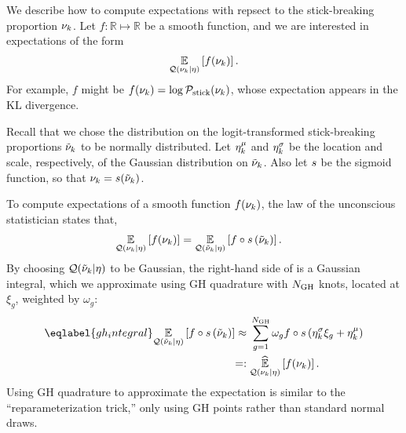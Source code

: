 We describe how to compute expectations with repsect to the stick-breaking
proportion $\nu_k$. Let $f: \mathbb{R}\mapsto\mathbb{R}$ be a smooth function,
and we are interested in expectations of the form
\begin{align*}
  \underset{\mathcal{Q}(\nu_{k} \vert \eta)}{\mathbb{E}}\left[f(\nu_{k})\right].
\end{align*}
For example, $f$ might be $f(\nu_k) = \log \mathcal{P}_{\mathrm{stick}}(\nu_k)$, whose
expectation appears in the $\mathrm{KL}$ divergence.

Recall that we chose the distribution on the logit-transformed
stick-breaking proportions $\tilde{\nu}_k$ to be normally distributed.
Let $\eta^{\mu}_k$ and $\eta^{\sigma}_k$ be the location and scale, respectively,
of the Gaussian distribution on $\tilde{\nu}_k$.
Also let $s$ be the sigmoid function, so that $\nu_k = s(\tilde{\nu}_k)$.

To compute expectations of a smooth function
$f(\nu_{k})$, the law of the unconscious statistician states that,
\begin{align*}
  \underset{\mathcal{Q}(\nu_{k} \vert \eta)}{\mathbb{E}}\left[f(\nu_{k})\right] ={}&
  \underset{\mathcal{Q}(\tilde{\nu}_k \vert \eta)}{\mathbb{E}}\left[f\circ s\left(\tilde{\nu}_k\right)\right].
\end{align*}
By choosing $\mathcal{Q}(\tilde{\nu}_k \vert \eta)$ to be Gaussian,
the right-hand side of is a Gaussian integral,
which we approximate
using GH quadrature with $N_{\mathrm{GH}}$ knots,
located at $\xi_g$, weighted by $\omega_g$:
%
\begin{align}\eqlabel{gh_integral}
%
\expect{\q(\lnu_\k \vert \eta)}
       {f\circ \s\left(\lnu_\k\right)}
\approx{}&
    \sum_{g=1}^{\ngh} \omega_g f\circ \s \left(\lnusd_\k \xi_{g} + \lnumean_\k\right)
 \nonumber\\=:{}&
\expecthat{\q(\nuk \vert \eta)}{f(\nuk)}.
%
\end{align}
%
Using GH quadrature to approximate the expectation
is similar to the ``reparameterization trick,'' only using
GH points rather than standard normal draws.
